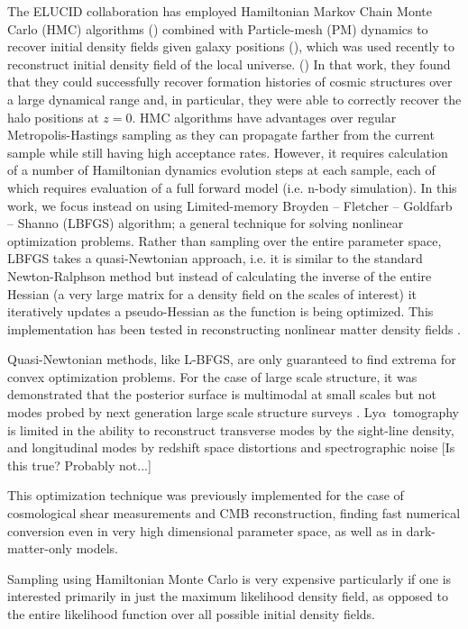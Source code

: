 \documentclass[times]{aastex62}
\newcommand{\lya}{Ly$\alpha$}
\begin{document}
The ELUCID collaboration has employed Hamiltonian Markov Chain Monte Carlo (HMC) algorithms (\cite{HMC}) combined with
Particle-mesh (PM) dynamics to recover initial density fields given galaxy positions (\cite{ECULID1}), which was used recently to reconstruct initial density field of the local universe. (\cite{ECULID3}) In that work, they found that they could successfully recover formation histories of cosmic structures over a large dynamical range and, in particular, they were able to correctly recover the halo positions at $z=0$.  HMC algorithms have advantages over regular Metropolis-Hastings sampling as they can propagate farther from the current sample while still having high acceptance rates. However, it requires calculation of a number of  Hamiltonian dynamics evolution steps at each sample, each of which requires evaluation of a full forward model (i.e. n-body simulation). In this work, we  focus instead on using Limited-memory Broyden – Fletcher – Goldfarb – Shanno (LBFGS) algorithm;\cite{NumRec} a general technique for solving nonlinear optimization problems. Rather than sampling over the entire parameter space, LBFGS takes a quasi-Newtonian approach, i.e. it is similar to the standard Newton-Ralphson method but instead of calculating the inverse of the entire Hessian (a very large matrix for a density field on the scales of interest) it iteratively updates a pseudo-Hessian as the function is being optimized. This implementation has been tested in reconstructing nonlinear matter density fields \cite{seljak2017towards}.

Quasi-Newtonian methods, like L-BFGS, are only guaranteed to find extrema for convex optimization problems. For the case of large scale structure, it was demonstrated that the posterior surface is multimodal at small scales but not modes probed by next generation large scale structure surveys \cite{2018fengseljakzaldarriaga}. \lya\ tomography is limited in the ability to reconstruct transverse modes by the sight-line density, and longitudinal modes by redshift space distortions and spectrographic noise [Is this true? Probably not...] 

This optimization technique was previously implemented for the case of cosmological shear measurements and CMB reconstruction, finding fast numerical conversion even in very high dimensional parameter space,\cite{2018Horowitz} as well as in dark-matter-only models.\cite{seljak2017towards,2018fengseljakzaldarriaga}

Sampling using Hamiltonian Monte Carlo is very expensive particularly if one is interested primarily in just the maximum likelihood density field, as opposed to the entire likelihood function over all possible initial density fields.
\end{document}
